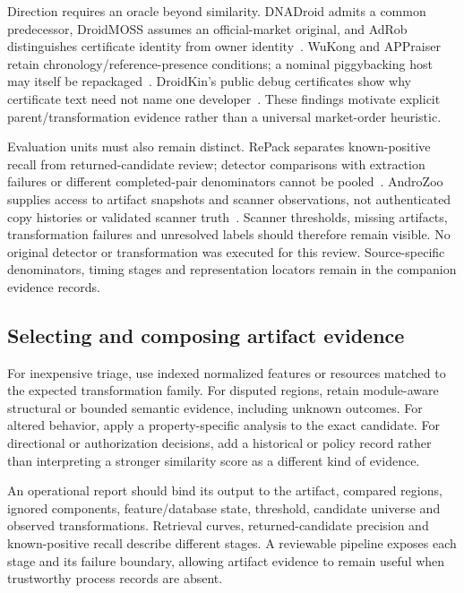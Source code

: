 Direction requires an oracle beyond similarity. DNADroid admits a common predecessor, DroidMOSS assumes an official-market original, and AdRob distinguishes certificate identity from owner identity~\cite{attackclones,droidmoss,adrob}. WuKong and APPraiser retain chronology/reference-presence conditions; a nominal piggybacking host may itself be repackaged~\cite{wukong,appraiser,piggybacking}. DroidKin's public debug certificates show why certificate text need not name one developer~\cite{droidkin}. These findings motivate explicit parent/transformation evidence rather than a universal market-order heuristic.

Evaluation units must also remain distinct. RePack separates known-positive recall from returned-candidate review; detector comparisons with extraction failures or different completed-pair denominators cannot be pooled~\cite{repack,repackeval,simidroid}. AndroZoo supplies access to artifact snapshots and scanner observations, not authenticated copy histories or validated scanner truth~\cite{androzoo}. Scanner thresholds, missing artifacts, transformation failures and unresolved labels should therefore remain visible. No original detector or transformation was executed for this review. Source-specific denominators, timing stages and representation locators remain in the companion evidence records.

\subsection{Selecting and composing artifact evidence}

For inexpensive triage, use indexed normalized features or resources matched to the expected transformation family. For disputed regions, retain module-aware structural or bounded semantic evidence, including unknown outcomes. For altered behavior, apply a property-specific analysis to the exact candidate. For directional or authorization decisions, add a historical or policy record rather than interpreting a stronger similarity score as a different kind of evidence.

An operational report should bind its output to the artifact, compared regions, ignored components, feature/database state, threshold, candidate universe and observed transformations. Retrieval curves, returned-candidate precision and known-positive recall describe different stages. A reviewable pipeline exposes each stage and its failure boundary, allowing artifact evidence to remain useful when trustworthy process records are absent.
